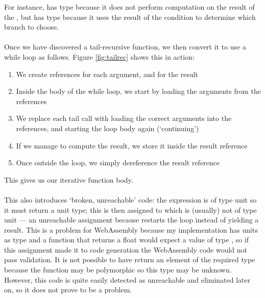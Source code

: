 For instance,  has type  because it does not perform computation on the result of the , but  has type  because it uses the result of the condition to determine which branch to choose.
\\\\
Once we have discovered a tail-recursive function, we then convert it to use a while loop as follows. Figure \ref{fig:tailrec} shows this in action:
\begin{enumerate}
\item We create references for each argument, and for the result
\item Inside the body of the while loop, we start by loading the arguments from the references
\item We replace each tail call with loading the correct arguments into the references, and starting the loop body again (`continuing')
\item If we manage to compute the result, we store it inside the result reference
\item Once outside the loop, we simply dereference the result reference
\end{enumerate}
This gives us our iterative function body.
\\\\
This also introduces `broken, unreachable' code: the  expression is of type unit so it must return a unit type; this is then assigned to  which is (usually) not of type unit --- an unreachable assignment because  restarts the loop instead of yielding a result. This is a problem for WebAssembly because my implementation has units as type  and a function that returns a float would expect a value of type , so if this assignment made it to code generation the WebAssembly code would not pass validation. It is not possible to have  return an element of the required type because the function may be polymorphic so this type may be unknown. However, this code is quite easily detected as unreachable and eliminated later on, so it does not prove to be a problem.

